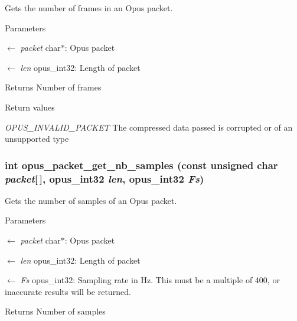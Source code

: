 Gets the number of frames in an Opus packet. 
\begin{DoxyParams}{Parameters}
\item[\mbox{$\leftarrow$} {\em packet}]{\ttfamily char$\ast$}: Opus packet \item[\mbox{$\leftarrow$} {\em len}]{\ttfamily opus\_\-int32}: Length of packet \end{DoxyParams}
\begin{DoxyReturn}{Returns}
Number of frames 
\end{DoxyReturn}

\begin{DoxyRetVals}{Return values}
\item[{\em OPUS\_\-INVALID\_\-PACKET}]The compressed data passed is corrupted or of an unsupported type \end{DoxyRetVals}
\hypertarget{group__opus__decoder_ga3cfec8b0bed7789ebd88c3b3370d337b}{
\subsubsection[{opus\_\-packet\_\-get\_\-nb\_\-samples}]{\setlength{\rightskip}{0pt plus 5cm}int opus\_\-packet\_\-get\_\-nb\_\-samples (const unsigned char {\em packet}\mbox{[}$\,$\mbox{]}, \/  {\bf opus\_\-int32} {\em len}, \/  {\bf opus\_\-int32} {\em Fs})}}
\label{group__opus__decoder_ga3cfec8b0bed7789ebd88c3b3370d337b}


Gets the number of samples of an Opus packet. 
\begin{DoxyParams}{Parameters}
\item[\mbox{$\leftarrow$} {\em packet}]{\ttfamily char$\ast$}: Opus packet \item[\mbox{$\leftarrow$} {\em len}]{\ttfamily opus\_\-int32}: Length of packet \item[\mbox{$\leftarrow$} {\em Fs}]{\ttfamily opus\_\-int32}: Sampling rate in Hz. This must be a multiple of 400, or inaccurate results will be returned. \end{DoxyParams}
\begin{DoxyReturn}{Returns}
Number of samples 
\end{DoxyReturn}

